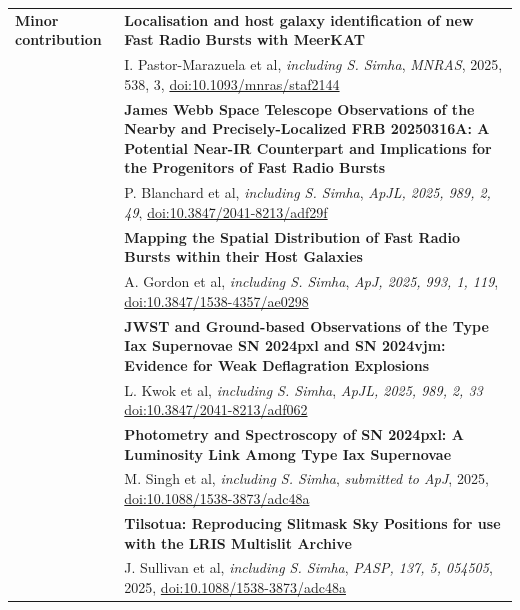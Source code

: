 \documentclass[letterpaper, 11pt]{article}
\begin{document}
\begin{longtable}{p{1.3in}p{4.8in}}
\textbf{Minor contribution} & \textbf{Localisation and host galaxy identification of new Fast Radio Bursts with MeerKAT}\\
& I. Pastor-Marazuela et al, \textit{including S. Simha}, \textit{MNRAS}, 2025, 538, 3, \href{https://ui.adsabs.harvard.edu/link_gateway/2025MNRAS.tmp.2025P/doi:10.1093/mnras/staf2144}{doi:10.1093/mnras/staf2144}\\


& \textbf{James Webb Space Telescope Observations of the Nearby and Precisely-Localized FRB 20250316A: A Potential Near-IR Counterpart and Implications for the Progenitors of Fast Radio Bursts}\\
& P. Blanchard et al, \textit{including S. Simha}, \textit{ApJL,  2025, 989, 2, 49}, \href{https://ui.adsabs.harvard.edu/link_gateway/2025ApJ...989L..49B/doi:10.3847/2041-8213/adf29f}{doi:10.3847/2041-8213/adf29f}\\

& \textbf{Mapping the Spatial Distribution of Fast Radio Bursts within their Host Galaxies}\\
& A. Gordon et al, \textit{including S. Simha}, \textit{ApJ, 2025, 993, 1, 119}, \href{https://ui.adsabs.harvard.edu/link_gateway/2025ApJ...993..119G/doi:10.3847/1538-4357/ae0298}{doi:10.3847/1538-4357/ae0298}\\

& \textbf{JWST and Ground-based Observations of the Type Iax Supernovae SN 2024pxl and SN 2024vjm: Evidence for Weak Deflagration Explosions }\\
& L. Kwok et al, \textit{including S. Simha}, \textit{ApJL, 2025, 989, 2, 33} \href{https://ui.adsabs.harvard.edu/link_gateway/2025ApJ...989L..33K/doi:10.3847/2041-8213/adf062}{doi:10.3847/2041-8213/adf062}\\

& \textbf{Photometry and Spectroscopy of SN 2024pxl: A Luminosity Link Among Type Iax Supernovae }\\
& M. Singh et al, \textit{including S. Simha}, \textit{submitted to ApJ}, 2025, \href{https://ui.adsabs.harvard.edu/link_gateway/2025arXiv250502943S/doi:10.48550/arXiv.2505.02943}{doi:10.1088/1538-3873/adc48a}\\

& \textbf{Tilsotua: Reproducing Slitmask Sky Positions for use with the LRIS Multislit Archive }\\
& J. Sullivan et al, \textit{including S. Simha}, \textit{PASP, 137, 5, 054505}, 2025, \href{https://ui.adsabs.harvard.edu/link_gateway/2025PASP..137e4505S/doi:10.1088/1538-3873/adc48a}{doi:10.1088/1538-3873/adc48a}\\



\end{longtable}
\end{document}
